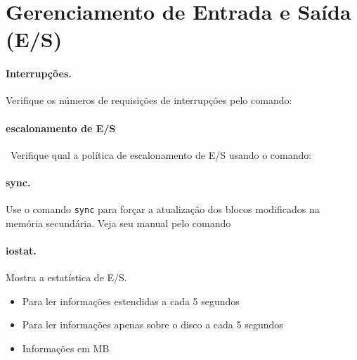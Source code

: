 \date{10/5/2016}
\maketitle

\section*{Gerenciamento de Entrada e Saída (E/S)}

\paragraph{Interrupções.} Verifique os números de requisições de  interrupções
pelo comando:


\paragraph{escalonamento de E/S}~Verifique qual a política de
escalonamento de E/S usando o comando:


\paragraph{sync.} Use o comando {\tt sync} para forçar
a atualização dos blocos modificados na memória secundária. Veja seu
manual pelo comando 


\paragraph{iostat.} Mostra a estatística de E/S. 

\begin{itemize}
\item Para ler informações estendidas a cada 5 segundos


\item Para ler informações apenas sobre o disco a cada 5 segundos


\item Informações em MB


\end{itemize}

